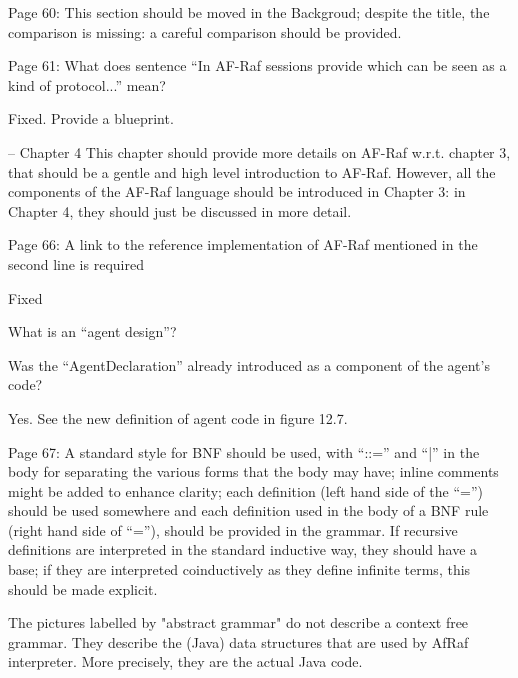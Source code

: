 \documentclass{article}
\newcommand{\todo}[1]{[\textcolor{red}{TODO}: #1]}
\newenvironment{them}{\noindent\begingroup\color{blue}}{\endgroup\par}
\begin{document}
\begin{them}

Page 60:
This section should be moved in the Backgroud; despite the title, the
comparison is missing: a careful comparison should be provided.

\end{them}
\todo{}

\begin{them}

Page 61:
What does sentence “In AF-Raf sessions provide which can be seen as a kind of
protocol...” mean?

\end{them}
Fixed. Provide a blueprint.

\begin{them}

-- Chapter 4
This chapter should provide more details on AF-Raf w.r.t. chapter 3, that
should be a gentle and high level introduction to AF-Raf. However, all the
components of the AF-Raf language should be introduced in Chapter 3: in Chapter
4, they should just be discussed in more detail.

\end{them}
\todo{}

\begin{them}

Page 66:
A link to the reference implementation of AF-Raf mentioned in the second line
is required

\end{them}
Fixed

\begin{them}

What is an “agent design”? 

\end{them}
\todo{}

\begin{them}

Was the “AgentDeclaration” already introduced as a component of the agent's
code?

\end{them}
Yes. See the new definition of agent code in figure 12.7.

\begin{them}

Page 67:
A standard style for BNF should be used, with “::=” and “|” in the body for
separating the various forms that the body may have; inline comments might be
added to enhance clarity; each definition (left hand side of the “=”) should be
used somewhere and each definition used in the body of a BNF rule (right hand
side of “=”), should be provided in the grammar. If recursive definitions are
interpreted in the standard inductive way, they should have a base; if they are
interpreted coinductively as they define infinite terms, this should be made
explicit. 

\end{them}
The pictures labelled by "abstract grammar" do not describe a context free
grammar. They describe the (Java) data structures that are used by AfRaf
interpreter. More precisely, they are the actual Java code.
\end{document}
